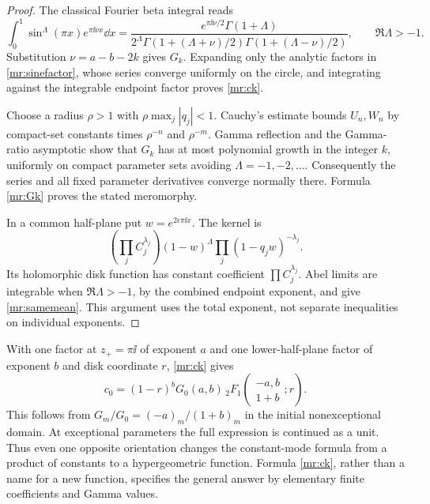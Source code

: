 \begin{proof}
The classical Fourier beta integral \cite[Eq.~5.12.6]{dlmf:beta} reads
\[
 \int_0^1\sin^\Lambda(\pi x)e^{\pi\ii\nu x}\dd x
  =\frac{e^{\pi\ii\nu/2}\Gamma(1+\Lambda)}
         {2^\Lambda\Gamma(1+(\Lambda+\nu)/2)
                         \Gamma(1+(\Lambda-\nu)/2)},\qquad
 \Re\Lambda>-1.
\]
Substitution $\nu=a-b-2k$ gives $G_k$. Expanding only the analytic
factors in \eqref{mr:sinefactor}, whose series converge uniformly on
the circle, and integrating against the integrable endpoint factor
proves \eqref{mr:ck}.

Choose a radius $\rho>1$ with $\rho\max_j|q_j|<1$. Cauchy's
estimate bounds $U_n,W_n$ by compact-set constants times $\rho^{-n}$
and $\rho^{-m}$. Gamma reflection and the Gamma-ratio asymptotic show
that $G_k$ has at most polynomial growth in the integer $k$, uniformly
on compact parameter sets avoiding $\Lambda=-1,-2,\ldots$.
Consequently the series and all fixed parameter derivatives converge
normally there. Formula \eqref{mr:Gk} proves the stated meromorphy.

In a common half-plane put $w=e^{2\epsilon\pi\ii x}$. The kernel is
\[
 \left(\prod_jC_j^{\lambda_j}\right)
       (1-w)^\Lambda\prod_j(1-q_jw)^{-\lambda_j}.
\]
Its holomorphic disk function has constant coefficient $\prod C_j^{\lambda_j}$.
Abel limits are integrable when $\Re\Lambda>-1$, by the combined
endpoint exponent, and give \eqref{mr:samemean}. This argument uses
the total exponent, not separate inequalities on individual exponents.
\end{proof}

\begin{remark}
With one factor at $z_+=\pi\ii$ of exponent $a$ and one lower-half-plane
factor of exponent $b$ and disk coordinate $r$, \eqref{mr:ck} gives
\begin{equation}\label{mr:gaussmean}
 c_0=(1-r)^bG_0(a,b)\,
       {}_2F_1\left(\begin{matrix}-a,b\\1+b\end{matrix};r\right).
\end{equation}
This follows from $G_m/G_0=(-a)_m/(1+b)_m$ in the initial
nonexceptional domain. At exceptional parameters the full expression is
continued as a unit. Thus even one opposite orientation changes the
constant-mode formula from a product of constants to a hypergeometric
function. Formula \eqref{mr:ck}, rather than a name for a new function,
specifies the general answer by elementary finite coefficients and Gamma
values.
\end{remark}

